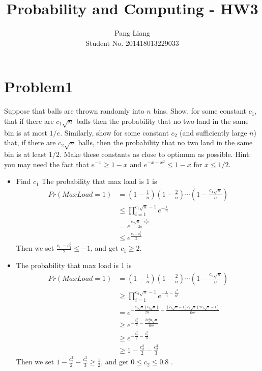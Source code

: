 \documentclass[12pt]{article}
\title{Probability and Computing - HW3}
\author{Pang Liang\\ Student No. 201418013229033}
\begin{document}
\maketitle

\section{Problem1}
Suppose that balls are thrown randomly into $n$ bins. Show, for some constant $c_1$, that
if there are $c_1\sqrt{n}$ balls then the probability that no two land in the same bin is at most
$1/e$. Similarly, show for some constant $c_2$ (and sufficiently large $n$) that, if there are $c_2\sqrt{n}$
balls, then the probability that no two land in the same bin is at least $1/2$. Make these
constants as close to optimum as possible. Hint: you may need the fact that $e^{-x} \ge 1-x$
and $e^{-x-x^2} \le 1-x$ for $x \le 1/2$.

\begin{itemize}
    \item Find $c_1$
    The probability that max load is 1 is
    \begin{equation}
        \begin{split}
        Pr(MaxLoad=1) &= (1-\frac{1}{n})(1-\frac{2}{n})\cdots (1-\frac{c_1\sqrt{n}}{n}) \\
        &\le \prod_{i=1}^{c_1\sqrt{n}-1} e^{-\frac{i}{n}} \\
        &= e^{\frac{c_1\sqrt{n}-c_1^2n}{2n}} \\
        &\le e^{\frac{c_1-c_1^2}{2}}
        \end{split}
    \end{equation}
    Then we set $\frac{c_1-c_1^2}{2} \le -1$, and get $c_1 \ge 2$.
    \item
    The probability that max load is 1 is
    \begin{equation}
        \begin{split}
        Pr(MaxLoad=1) &= (1-\frac{1}{n})(1-\frac{2}{n})\cdots (1-\frac{c_2\sqrt{n}}{n}) \\
        &\ge \prod_{i=1}^{c_2\sqrt{n}-1} e^{-\frac{i}{n}-\frac{i^2}{n^2}} \\
        &= e^{ -\frac{c_2\sqrt{n}(c_2\sqrt{n})}{2n} -\frac{(c_2\sqrt{n}-1)c_2\sqrt{n}(2c_2\sqrt{n}-1)}{6n^2}} \\
        &\ge e^{ -\frac{c_2^2}{2} -\frac{2c_2^3n\sqrt{n}}{6n^2} } \\
        &\ge e^{ -\frac{c_2^2}{2} -\frac{c_2^3}{3} } \\
        &\ge 1 -\frac{c_2^2}{2} -\frac{c_2^3}{3}
        \end{split}
    \end{equation}
    Then we set $1 -\frac{c_2^2}{2} -\frac{c_2^3}{3} \ge \frac{1}{2}$, and get $0 \le c_2 \le 0.8$ .
\end{itemize}
\end{document}
